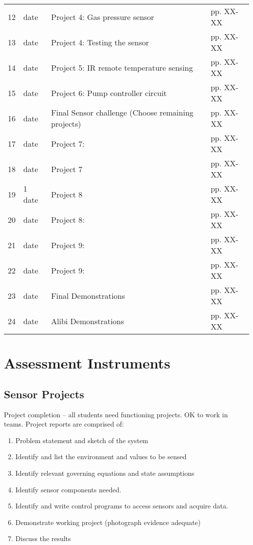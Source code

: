 \documentclass[12pt]{article}
\begin{document}
\begin{longtable}{p{0.1in}p{0.8in}p{4.6in}p{1.0in}}
12 &  date  & Project 4: Gas pressure sensor & pp. XX-XX \\
13 &  date  & Project 4: Testing the sensor & pp. XX-XX\\
\hline
14 &  date  & Project 5: IR remote temperature sensing & pp. XX-XX \\
15 &  date  & Project 6: Pump controller circuit & pp. XX-XX\\
16 &  date  & Final Sensor challenge (Choose remaining projects) & pp. XX-XX \\
17 &  date &  Project 7:  & pp. XX-XX\\
\hline
18 &  date  &  Project 7  & pp. XX-XX\\
19 & 1 date  &  Project 8  & pp. XX-XX \\
\hline
20 &  date  &  Project 8: & pp. XX-XX  \\
21 & date  & Project 9:  & pp. XX-XX \\
22 &  date &  Project 9: & pp. XX-XX \\
23 & date  & Final Demonstrations & pp. XX-XX\\
24 &  date & Alibi Demonstrations& pp. XX-XX\\
\hline
\hline
\end{longtable}
\normalsize



%
\section*{Assessment Instruments}
\subsection*{Sensor Projects}
Project completion -- all students need functioning projects.  OK to work in teams.
Project reports are comprised of:
\begin{enumerate}
\item Problem statement and sketch of the system
\item Identify and list the  environment and values to be sensed
\item  Identify relevant governing equations and state assumptions
\item Identify sensor components needed.
\item Identify and write control programs to access sensors and acquire data.
\item Demonstrate working project (photograph evidence adequate)
\item Discuss the results
\end{enumerate}
\end{document}
